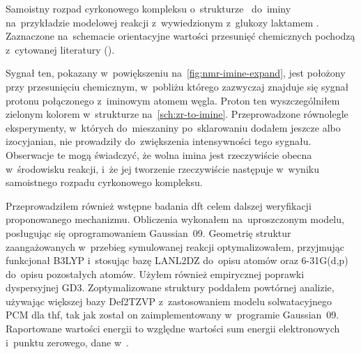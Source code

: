 \begin{scheme*}
  
  \caption{
    Samoistny rozpad cyrkonowego kompleksu o~strukturze~ do~iminy
      na~przykładzie modelowej reakcji z~wywiedzionym z~glukozy laktamem .
    Zaznaczone na~schemacie orientacyjne wartości przesunięć chemicznych pochodzą
      z~cytowanej literatury \textcolor{\citationcolor}{()}.
  }\label{sch:zr-to-imine}
\end{scheme*}

Sygnał ten, pokazany w~powiększeniu na~\cref{fig:nmr-imine-expand}, jest położony przy
  przesunięciu chemicznym, w~pobliżu którego zazwyczaj znajduje się sygnał protonu połączonego
  z~iminowym atomem węgla.
Proton ten wyszczególniłem zielonym kolorem w~strukturze
   na~\cref{sch:zr-to-imine}.
Przeprowadzone równolegle eksperymenty, w~których do~mieszaniny po~sklarowaniu dodałem jeszcze
   albo izocyjanian, nie prowadziły do~zwiększenia intensywności tego
  sygnału.
Obserwacje te mogą świadczyć, że wolna imina jest rzeczywiście obecna w~środowisku reakcji,
  i~że jej tworzenie rzeczywiście następuje w~wyniku samoistnego rozpadu cyrkonowego kompleksu.

Przeprowadziłem również wstępne badania \gls{dft} celem dalszej weryfikacji proponowanego
  mechanizmu.
Obliczenia wykonałem na~uproszczonym modelu, posługując się oprogramowaniem Gaussian~09.
Geometrię struktur zaangażowanych w~przebieg symulowanej reakcji optymalizowałem, przyjmując
  funkcjonał B3LYP i~stosując bazę LANL2DZ do~opisu atomów 
  oraz 6-31G(d,p) do~opisu pozostałych atomów.
Użyłem również empirycznej poprawki dyspersyjnej GD3.
Zoptymalizowane struktury poddałem powtórnej analizie, używając większej bazy Def2TZVP
  z~zastosowaniem modelu solwatacyjnego PCM dla \gls{thf}, tak jak został on
  zaimplementowany w~programie Gaussian~09.
Raportowane wartości energii to względne wartości sum energii elektronowych i~punktu zerowego,
  dane w~\si{\kcalpm}.

